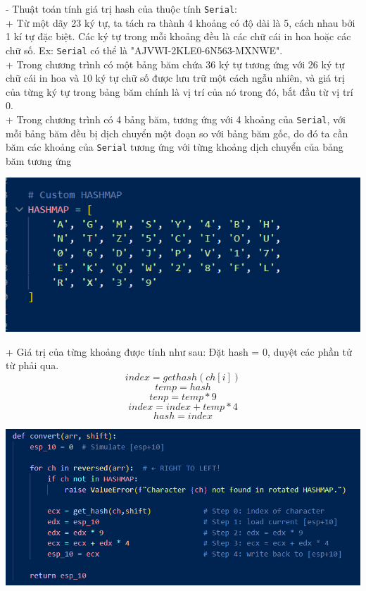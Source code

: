 - Thuật toán tính giá trị hash của thuộc tính \texttt{Serial}:\\
+ Từ một dãy 23 ký tự, ta tách ra thành 4 khoảng có độ dài là 5, cách nhau bởi 1 kí tự đặc biệt. Các ký tự trong mỗi khoảng đều là các chữ cái in hoa hoặc các chữ số. Ex: \texttt{Serial} có thể là "AJVWI-2KLE0-6N563-MXNWE". \\
+ Trong chương trình có một bảng băm chứa 36 ký tự tương ứng với 26 ký tự chữ cái in hoa và 10 ký tự chữ số được lưu trữ một cách ngẫu nhiên, và giá trị của từng ký tự trong bảng băm chính là vị trí của nó trong đó, bắt đầu từ vị trí 0.\\
+ Trong chương trình có 4 bảng băm, tương ứng với 4 khoảng của \texttt{Serial}, với mỗi bảng băm đều bị dịch chuyển một đoạn so với bảng băm gốc, do đó ta cần băm các khoảng của \texttt{Serial} tương ứng với từng khoảng dịch chuyển của bảng băm tương ứng\\
\begin{center}
    \includegraphics[width=\textwidth]{img/file-2/code2.PNG}
\end{center}
+ Giá trị của từng khoảng được tính như sau:
Đặt hash = 0, duyệt các phần tử từ phải qua.\\
\[
    index = gethash(ch[i])
\]
\[
    temp = hash
\]
\[
    tenp = temp * 9
\]
\[
    index = index + temp * 4
\]
\[
    hash = index
\]

\begin{center}
    \includegraphics[width=\textwidth]{img/file-2/code3.PNG}
\end{center}

